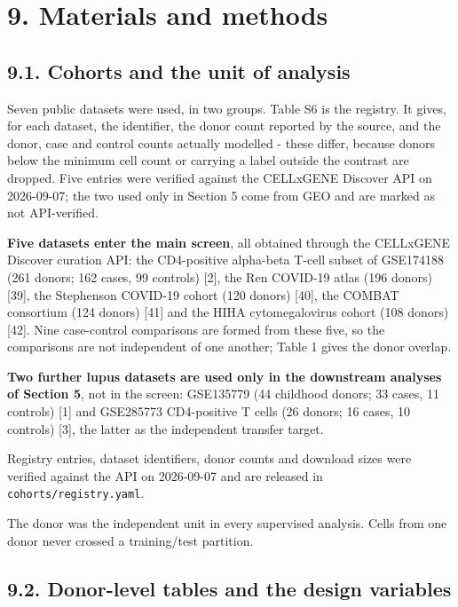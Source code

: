 \section{9. Materials and methods}\label{materials-and-methods}

\subsection{9.1. Cohorts and the unit of analysis}\label{cohorts-and-the-unit-of-analysis}

Seven public datasets were used, in two groups. Table S6 is the registry. It gives, for each dataset, the identifier, the donor count reported by the source, and the donor, case and control counts actually modelled - these differ, because donors below the minimum cell count or carrying a label outside the contrast are dropped. Five entries were verified against the CELLxGENE Discover API on 2026-09-07; the two used only in Section 5 come from GEO and are marked as not API-verified.

\textbf{Five datasets enter the main screen}, all obtained through the CELLxGENE Discover curation API: the CD4-positive alpha-beta T-cell subset of GSE174188 (261 donors; 162 cases, 99 controls) {[}2{]}, the Ren COVID-19 atlas (196 donors) {[}39{]}, the Stephenson COVID-19 cohort (120 donors) {[}40{]}, the COMBAT consortium (124 donors) {[}41{]} and the HIHA cytomegalovirus cohort (108 donors) {[}42{]}. Nine case-control comparisons are formed from these five, so the comparisons are not independent of one another; Table 1 gives the donor overlap.

\textbf{Two further lupus datasets are used only in the downstream analyses of Section 5}, not in the screen: GSE135779 (44 childhood donors; 33 cases, 11 controls) {[}1{]} and GSE285773 CD4-positive T cells (26 donors; 16 cases, 10 controls) {[}3{]}, the latter as the independent transfer target.

Registry entries, dataset identifiers, donor counts and download sizes were verified against the API on 2026-09-07 and are released in \texttt{cohorts/registry.yaml}.

The donor was the independent unit in every supervised analysis. Cells from one donor never crossed a training/test partition.

\subsection{9.2. Donor-level tables and the design variables}\label{donor-level-tables-and-the-design-variables}

